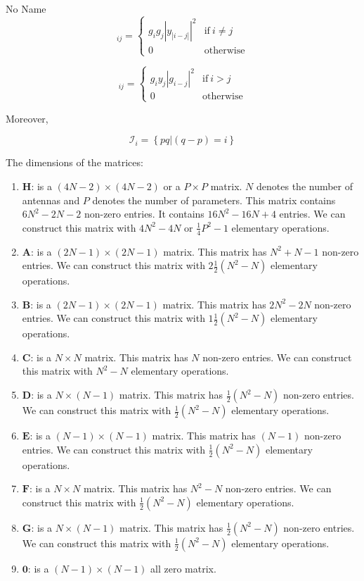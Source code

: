 \documentclass[a4paper,10pt]{article}
\begin{document}
\begin{section}{No Name}
\begin{equation}
[\boldsymbol{F}]_{ij} = 
\begin{cases}
 g_i g_j  \left | y_{|i-j|} \right |^2  & \textrm{if} ~ i \neq j\\
 0 & \textrm{otherwise}
\end{cases}
\end{equation}

\begin{equation}
[\boldsymbol{G}]_{ij} = 
\begin{cases}
 g_i y_j  \left | g_{i-j} \right |^2  & \textrm{if} ~ i > j\\
 0 & \textrm{otherwise}
\end{cases}
\end{equation}

Moreover, 

\begin{equation}
\mathcal{I}_i = \left\{pq|(q - p) = i \right\}
\end{equation}

The dimensions of the matrices:

\begin{enumerate}
\item $\boldsymbol{H}$: is a $(4N-2)\times(4N-2)$ or a $P \times P$ matrix. $N$ denotes the number of antennas and $P$ denotes the number of parameters. This matrix
contains $6N^2 - 2N - 2$ non-zero entries. It contains $16N^2 - 16N + 4$ entries. We can construct this matrix with $4N^2 -  4N$ or $\frac{1}{4} P^2 -1$ elementary operations.
\item $\boldsymbol{A}$: is a $(2N-1)\times(2N-1)$ matrix. This matrix has $N^2 + N - 1$ non-zero entries. We can construct this matrix with $2\frac{1}{2} (N^2 -  N)$ elementary operations.  
\item $\boldsymbol{B}$: is a $(2N-1)\times(2N-1)$ matrix. This matrix has $2N^2 - 2N$ non-zero entries. We can construct this matrix with $1\frac{1}{2} (N^2 -  N)$ elementary operations.
\item $\boldsymbol{C}$: is a $N\times N$ matrix. This matrix has $N$ non-zero entries. We can construct this matrix with $N^2-N$ elementary operations.
\item $\boldsymbol{D}$: is a $N \times (N-1)$ matrix. This matrix has $\frac{1}{2} (N^2 -  N)$ non-zero entries. We can construct this matrix with $\frac{1}{2} (N^2 -  N)$ elementary operations. 
\item $\boldsymbol{E}$: is a $(N-1) \times (N-1)$ matrix. This matrix has $(N-1)$ non-zero entries. We can construct this matrix with $\frac{1}{2} (N^2 -  N)$ elementary operations.  
\item $\boldsymbol{F}$: is a $N \times N$ matrix. This matrix has $N^2 - N$ non-zero entries. We can construct this matrix with $\frac{1}{2} (N^2 -  N)$ elementary operations.
\item $\boldsymbol{G}$: is a $N \times (N-1)$ matrix. This matrix has $\frac{1}{2} (N^2 -  N)$ non-zero entries. We can construct this matrix with $\frac{1}{2} (N^2 -  N)$ elementary operations.
\item $\boldsymbol{0}$: is a $(N-1) \times (N-1)$ all zero matrix. 
\end{enumerate}


\end{section}
\end{document}
